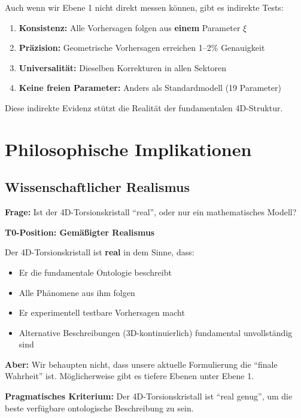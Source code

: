 	Auch wenn wir Ebene 1 nicht direkt messen können, gibt es indirekte Tests:
	
	\begin{enumerate}
		\item \textbf{Konsistenz:} Alle Vorhersagen folgen aus \textbf{einem} Parameter $\xi$
		\item \textbf{Präzision:} Geometrische Vorhersagen erreichen 1--2\% Genauigkeit
		\item \textbf{Universalität:} Dieselben Korrekturen in allen Sektoren
		\item \textbf{Keine freien Parameter:} Anders als Standardmodell (19 Parameter)
	\end{enumerate}
	
	Diese indirekte Evidenz stützt die Realität der fundamentalen 4D-Struktur.
	
	\section{Philosophische Implikationen}
	
	\subsection{Wissenschaftlicher Realismus}
	
	\begin{philosophical}
		\textbf{Frage:} Ist der 4D-Torsionskristall \enquote{real}, oder nur ein mathematisches Modell?
		
		\vspace{0.3cm}
		
		\textbf{T0-Position: Gemäßigter Realismus}
		
		Der 4D-Torsionskristall ist \textbf{real} in dem Sinne, dass:
		\begin{itemize}
			\item Er die fundamentale Ontologie beschreibt
			\item Alle Phänomene aus ihm folgen
			\item Er experimentell testbare Vorhersagen macht
			\item Alternative Beschreibungen (3D-kontinuierlich) fundamental unvollständig sind
		\end{itemize}
		
		\vspace{0.3cm}
		
		\textbf{Aber:}
		Wir behaupten nicht, dass unsere aktuelle Formulierung die \enquote{finale Wahrheit} ist. Möglicherweise gibt es tiefere Ebenen unter Ebene 1.
		
		\vspace{0.3cm}
		
		\textbf{Pragmatisches Kriterium:}
		Der 4D-Torsionskristall ist \enquote{real genug}, um die beste verfügbare ontologische Beschreibung zu sein.
	\end{philosophical}
	
